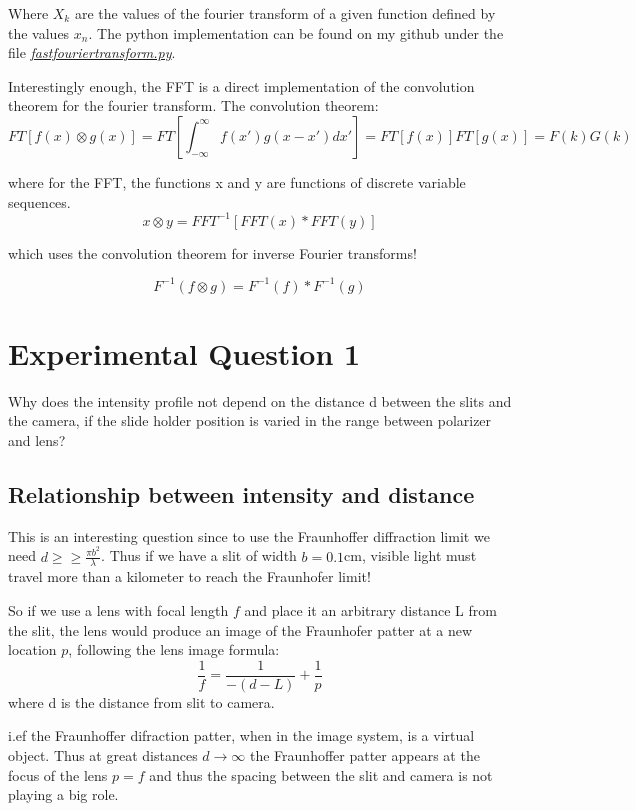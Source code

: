 \documentclass{article}
\begin{document}
Where $X_k$ are the values of the fourier transform of a given function defined by the values $x_n$. The python implementation can be found on my github under the file \href{https://github.com/fusionby2030/Numerical_Methods/tree/master/Labs/017E/fastfouriertransform.py}{\textit{fastfouriertransform.py}}.

Interestingly enough, the FFT is a direct implementation of the convolution theorem for the fourier transform. The convolution theorem:
$$FT[f(x) \otimes g(x)] = FT[\int_{-\infty}^{\infty} f(x')g(x-x')dx'] = FT[f(x)]FT[g(x)]=F(k)G(k) $$

where for the FFT, the functions x and y are functions of discrete variable sequences.
$$x\otimes y = FFT^{-1} [FFT(x) * FFT(y)] $$

which uses the convolution theorem for inverse Fourier transforms!

$$ F^{-1} (f\otimes g) = F^{-1}(f)* F^{-1}(g) $$


\section{Experimental Question 1}
Why does the intensity profile not depend on the distance d between the slits and the camera, if the slide holder position is varied in the range between polarizer and lens?

\subsection{Relationship between intensity and distance}
This is an interesting question since to use the Fraunhoffer diffraction limit we need $d \geq \geq \frac{\pi b^2}{\lambda} $. Thus if we have a slit of width $b = 0.1$cm, visible light must travel more than a kilometer to reach the Fraunhofer limit!

So if we use a lens with focal length $f$ and place it an arbitrary distance L from the slit, the lens would produce an image of the Fraunhofer patter at a new location $p$, following the lens image formula: $$\frac{1}{f} = \frac{1}{-(d-L)}+\frac{1}{p} $$ where d is the distance from slit to camera.

i.ef the Fraunhoffer difraction patter, when in the image system, is a virtual object. Thus at great distances $d \rightarrow \infty$ the Fraunhoffer patter appears at the focus of the lens $p = f$ and thus the spacing between the slit and camera is not playing a big role.
\\
\\
\\
\end{document}
